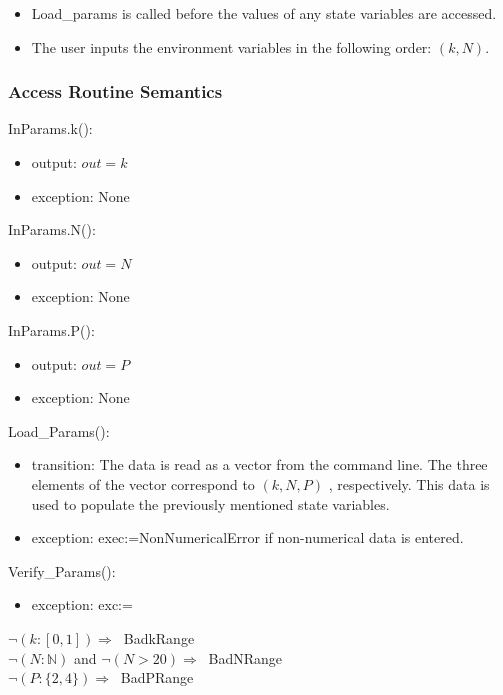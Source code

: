 \documentclass[12pt, titlepage]{article}
\begin{document}
\begin{itemize}
	\item Load\_params is called before the values of any state variables are 
	accessed.
	\item The user inputs the environment variables in the following order: 
	$(k,N)$.
\end{itemize}

\subsubsection{Access Routine Semantics}

\noindent InParams.k():
\begin{itemize}
\item output: $out = k$
\item exception: None
\end{itemize}

\noindent InParams.N():
\begin{itemize}
	\item output: $out = N$
	\item exception: None
\end{itemize}

\noindent InParams.P():
\begin{itemize}
	\item output: $out = P$
	\item exception: None
\end{itemize}

\noindent Load\_Params():
\begin{itemize}
	\item transition: The data is read as a vector from the command line. The 
	three elements of the vector correspond to $(k,N,P)$ , respectively. This 
	data is used to populate the 
	previously mentioned state variables. 
	\item exception: exec:=NonNumericalError if non-numerical data is entered. 
\end{itemize} 

\noindent Verify\_Params():
\begin{itemize}
	\item exception: exc:=
\end{itemize}  

\noindent 
$\neg (k : [0,1]) \Rightarrow \ $ BadkRange\\
$\neg (N : \mathbb{N})$ and $\neg(N>20) \Rightarrow \ $ BadNRange\\
$\neg (P : \{2,4\} ) \Rightarrow \ $ BadPRange
\end{document}
